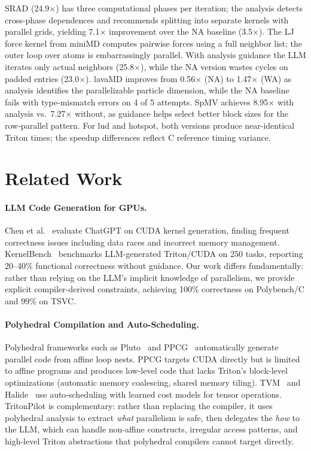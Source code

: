 \documentclass[sigconf]{acmart}
\newcommand{\sysname}{TritonPilot\xspace}
\begin{document}
SRAD (24.9$\times$) has three computational phases per iteration;
the analysis detects cross-phase dependences and recommends splitting
into separate kernels with parallel grids, yielding 7.1$\times$
improvement over the NA baseline (3.5$\times$).
The LJ force kernel from miniMD computes pairwise forces using a full
neighbor list; the outer loop over atoms is embarrassingly parallel.
With analysis guidance the LLM iterates only actual neighbors
(25.8$\times$), while the NA version wastes cycles on padded entries
(23.0$\times$).
lavaMD improves from 0.56$\times$ (NA) to 1.47$\times$ (WA) as
analysis identifies the parallelizable particle dimension, while the
NA baseline fails with type-mismatch errors on 4 of 5 attempts.
SpMV achieves 8.95$\times$ with analysis vs.\ 7.27$\times$ without,
as guidance helps select better block sizes for the row-parallel pattern.
For lud and hotspot, both versions produce near-identical Triton
times; the speedup differences reflect C reference timing variance.


\section{Related Work}
\label{sec:related}

\paragraph{LLM Code Generation for GPUs.}
Chen et al.~\cite{chen2024chatgpt} evaluate ChatGPT on CUDA kernel
generation, finding frequent correctness issues including data races and
incorrect memory management.
KernelBench~\cite{ouyang2024kernelbench} benchmarks LLM-generated
Triton/CUDA on 250 tasks, reporting 20--40\% functional correctness
without guidance.  Our work differs fundamentally: rather than relying
on the LLM's implicit knowledge of parallelism, we provide explicit
compiler-derived constraints, achieving 100\% correctness on
Polybench/C and 99\% on TSVC.

\paragraph{Polyhedral Compilation and Auto-Scheduling.}
Polyhedral frameworks such as Pluto~\cite{bondhugula2008pluto} and
PPCG~\cite{verdoolaege2013ppcg} automatically generate parallel code
from affine loop nests.  PPCG targets CUDA directly but is limited to
affine programs and produces low-level code that lacks Triton's
block-level optimizations (automatic memory coalescing, shared memory
tiling).  TVM~\cite{chen2018tvm} and Halide~\cite{ragan2013halide}
use auto-scheduling with learned cost models for tensor operations.
\sysname is complementary: rather than replacing the compiler,
it uses polyhedral analysis to extract \emph{what} parallelism is
safe, then delegates the \emph{how} to the LLM, which can handle
non-affine constructs, irregular access patterns, and high-level
Triton abstractions that polyhedral compilers cannot target directly.
\end{document}
